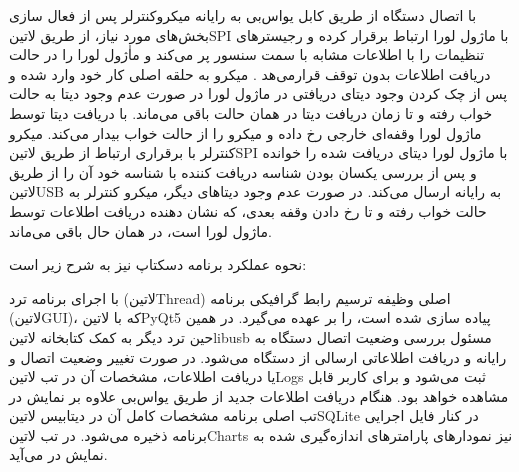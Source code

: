 با اتصال دستگاه از طریق کابل یو‌اس‌بی به رایانه میکروکنترلر پس از فعال سازی بخش‌های مورد نیاز، از طریق ‌لاتین{SPI} با ماژول لورا ارتباط برقرار کرده و رجیستر‌های تنظیمات را با اطلاعات مشابه با سمت سنسور پر می‌کند و ماٰژول لورا را در حالت دریافت اطلاعات بدون توقف قرار‌می‌هد .
میکرو به حلقه اصلی کار خود وارد شده و پس از چک کردن وجود دیتای دریافتی در ماژول لورا در صورت عدم وجود دیتا به حالت خواب رفته و تا زمان دریافت دیتا در همان حالت باقی می‌ماند.
با دریافت دیتا توسط ماژول لورا وقفه‌ای خارجی رخ داده و میکرو را از حالت خواب بیدار می‌کند.
میکرو کنترلر با برقراری ارتباط از طریق ‌لاتین{SPI} با ماژول لورا دیتای دریافت شده را خوانده و پس از بررسی یکسان بودن شناسه دریافت کننده با شناسه خود آن را از طریق ‌لاتین{USB} به رایانه ارسال می‌کند.
در صورت عدم وجود دیتا‌های دیگر، میکرو کنترلر به حالت خواب رفته و تا رخ دادن وقفه بعدی، که نشان دهنده دریافت اطلاعات توسط ماژول لورا است، در همان حال باقی می‌ماند.

نحوه عملکرد برنامه دسکتاپ نیز به شرح زیر است:

با اجرای برنامه ترد (‌لاتین{Thread}) اصلی وظیفه ترسیم رابط گرافیکی برنامه (‌لاتین{GUI})، که با ‌لاتین{PyQt5} پیاده سازی شده است، را بر عهده می‌گیرد.
در همین حین ترد دیگر به کمک کتابخانه ‌لاتین{libusb} مسئول بررسی وضعیت اتصال دستگاه به رایانه و دریافت اطلاعاتی ارسالی از دستگاه می‌شود.
در صورت تغییر وضعیت اتصال و یا دریافت اطلاعات، مشخصات آن در تب ‌لاتین{Logs} ثبت می‌شود و برای کاربر قابل مشاهده خواهد بود.
هنگام دریافت اطلاعات جدید از طریق یو‌اس‌بی علاوه بر نمایش در تب اصلی برنامه مشخصات کامل آن در دیتابیس ‌لاتین{SQLite} در کنار فایل اجرایی برنامه ذخیره می‌شود. 
در تب ‌لاتین{Charts} نیز نمودار‌های پارامتر‌های اندازه‌گیری شده به نمایش در می‌آید.







